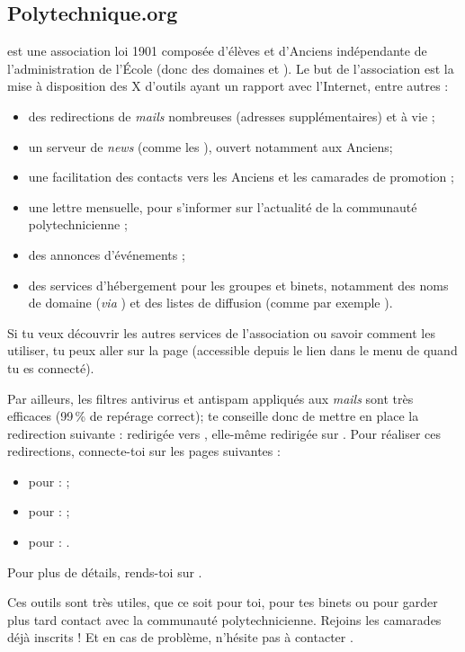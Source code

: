 \subsection{Polytechnique.org}
 est une association loi 1901 composée d'élèves et d'Anciens
 indépendante de l'administration de l'\'Ecole (donc des domaines 
 et ). Le but de l'association est la mise à disposition des X d'outils
ayant un rapport avec l'Internet, entre autres :
\begin{itemize}
  \item des redirections de \emph{mails} nombreuses (adresses supplémentaires) et à vie ;
  \item un serveur de \emph{news} (comme les ), ouvert notamment aux Anciens;
  \item une facilitation des contacts vers les Anciens et les camarades de promotion ;
  \item une lettre mensuelle, pour s'informer sur l'actualité de la communauté polytechnicienne ;
  \item des annonces d'événements ;
  \item des services d'hébergement pour les groupes et binets, notamment des noms de domaine (\emph{via} ) et des listes de diffusion (comme par exemple ).
\end{itemize}
Si tu veux découvrir les autres services de l'association ou savoir
comment les utiliser, tu peux aller sur la page
 (accessible depuis
le lien  dans le menu de 
quand tu es connecté).

Par ailleurs, les filtres antivirus et antispam appliqués aux \emph{mails} sont très efficaces (99\,\% de repérage correct);  te conseille donc de mettre en place la redirection suivante :
redirigée vers ,
elle-même redirigée sur .
Pour réaliser ces redirections, connecte-toi sur les pages suivantes :
\begin{itemize}
  \item pour  :  ;
  \item pour  :  ;
  \item pour  : .
\end{itemize}
Pour plus de détails, rends-toi sur .


 Ces outils sont très utiles, que
ce soit pour toi, pour tes binets ou pour garder plus tard contact avec la communauté polytechnicienne. Rejoins
les  camarades déjà inscrits ! Et en cas de problème, n'hésite pas à contacter
.
